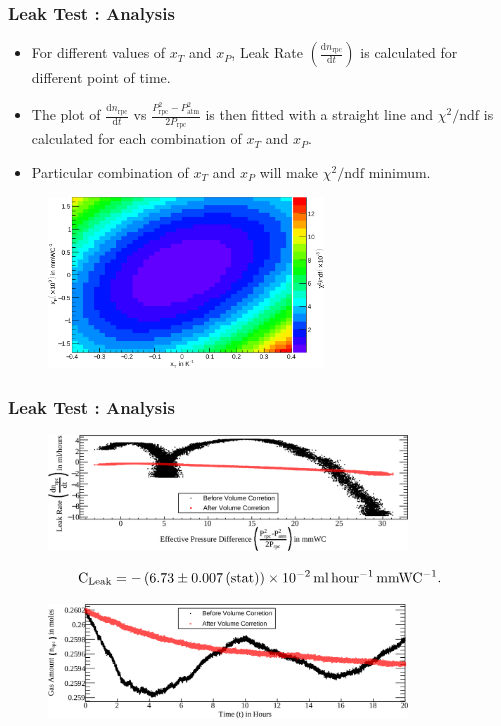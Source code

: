 \documentclass{beamer}
\begin{document}
\begin{frame}
  \frametitle{Leak Test : Analysis}
  \begin{itemize}
  \item For different values of $x_T$ and $x_P$, Leak Rate $\left(\frac{\mathrm{d}n_{\textrm{rpc}}}{\mathrm{d}t}\right)$ is calculated for different point of time.
  \item The plot of $\frac{\mathrm{d}n_{\textrm{rpc}}}{\mathrm{d}t}$ vs $\frac{P_{\textrm{rpc}}^{2}-P_{\textrm{atm}}^{2}}{2P_{\textrm{rpc}}}$ is then fitted with a straight line and $\chi^2/\textrm{ndf}$ is calculated for each combination of $x_T$ and $x_P$.
  \item Particular combination of $x_T$ and $x_P$ will make $\chi^2/\textrm{ndf}$ minimum.
  \end{itemize}
  \begin{figure}[!h]
    \includegraphics[width=0.65\textwidth]{cor_factors.png}
  \end{figure}
\end{frame}

\begin{frame}
  \frametitle{Leak Test : Analysis}
  \begin{figure}[!h]
    \includegraphics[width=0.85\textwidth]{Q_dP_57.png}
  \end{figure}
  \[\textrm{C}_{\textrm{Leak}}=-\left(6.73\pm 0.007\left(\textrm{stat}\right)\right)\times 10^{-2}\textrm{\,ml\,hour$^{-1}$\,mmWC$^{-1}$}.\]
  \begin{figure}[!h]
    \includegraphics[width=0.85\textwidth]{M_t_57.png}
  \end{figure}
\end{frame}
\end{document}
